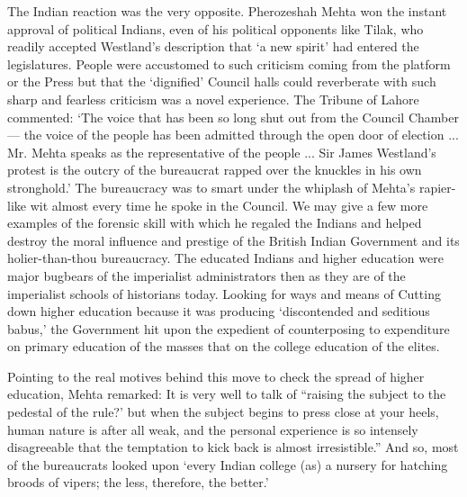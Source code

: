\begin{multicols}{2}
The Indian reaction was the very opposite. Pherozeshah Mehta won the instant approval of political Indians, even of his political opponents like Tilak, who readily accepted Westland's description that `a new spirit' had entered the legislatures. People were accustomed to such criticism coming from the platform or the Press but that the `dignified' Council halls could reverberate with such sharp and fearless criticism was a novel experience. The Tribune of Lahore commented: `The voice that has been so long shut out from the Council Chamber --- the voice of the people has been admitted through the open door of election ... Mr. Mehta speaks as the representative of the people ... Sir James Westland's protest is the outcry of the bureaucrat rapped over the knuckles in his own stronghold.' The bureaucracy was to smart under the whiplash of Mehta's rapier-like wit almost every time he spoke in the Council. We may give a few more examples of the forensic skill with which he regaled the Indians and helped destroy the moral influence and prestige of the British Indian Government and its holier-than-thou bureaucracy. The educated Indians and higher education were major bugbears of the imperialist administrators then as they are of the imperialist schools of historians today. Looking for ways and means of Cutting down higher education because it was producing `discontended and seditious babus,' the Government hit upon the expedient of counterposing to expenditure on primary education of the masses that on the college education of the elites.

Pointing to the real motives behind this move to check the spread of higher education, Mehta remarked: It is very well to talk of ``raising the subject to the pedestal of the rule?' but when the subject begins to press close at your heels, human nature is after all weak, and the personal experience is so intensely disagreeable that the temptation to kick back is almost irresistible.'' And so, most of the bureaucrats looked upon `every Indian college (as) a nursery for hatching broods of vipers; the less, therefore, the better.'


\end{multicols}
